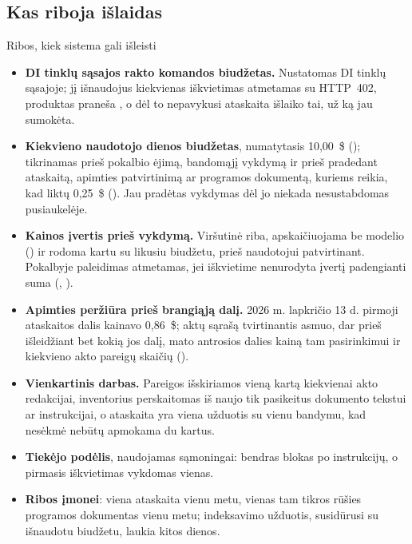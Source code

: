 \subsection{Kas riboja išlaidas}

\begin{codebox}{Ribos, kiek sistema gali išleisti}
\begin{itemize}
  \item \textbf{DI tinklų sąsajos rakto komandos biudžetas.} Nustatomas DI tinklų sąsajoje;
    jį išnaudojus kiekvienas iškvietimas atmetamas su HTTP~402, produktas praneša
    , o dėl to nepavykusi ataskaita išlaiko tai, už ką jau
    sumokėta.
  \item \textbf{Kiekvieno naudotojo dienos biudžetas}, numatytasis 10,00~\$
    (); tikrinamas prieš pokalbio ėjimą, bandomąjį vykdymą ir
    prieš pradedant ataskaitą, apimties patvirtinimą ar programos dokumentą, kuriems reikia,
    kad liktų 0,25~\$ (). Jau pradėtas vykdymas dėl jo
    niekada nesustabdomas pusiaukelėje.
  \item \textbf{Kainos įvertis prieš vykdymą.} Viršutinė riba, apskaičiuojama be modelio
    () ir rodoma kartu su likusiu biudžetu, prieš naudotojui
    patvirtinant. Pokalbyje paleidimas atmetamas, jei iškvietime nenurodyta įvertį
    padengianti suma (, ).
  \item \textbf{Apimties peržiūra prieš brangiąją dalį.} 2026 m. lapkričio 13 d. pirmoji
    ataskaitos dalis kainavo 0,86~\$; aktų sąrašą tvirtinantis asmuo, dar prieš išleidžiant
    bet kokią jos dalį, mato antrosios dalies kainą tam pasirinkimui ir kiekvieno akto
    pareigų skaičių ().
  \item \textbf{Vienkartinis darbas.} Pareigos išskiriamos vieną kartą kiekvienai akto
    redakcijai, inventorius perskaitomas iš naujo tik pasikeitus dokumento tekstui ar
    instrukcijai, o ataskaita yra viena užduotis su vienu bandymu, kad nesėkmė nebūtų
    apmokama du kartus.
  \item \textbf{Tiekėjo podėlis}, naudojamas sąmoningai: bendras blokas po instrukcijų, o
    pirmasis iškvietimas vykdomas vienas.
  \item \textbf{Ribos įmonei}: viena ataskaita vienu metu, vienas tam tikros rūšies programos
    dokumentas vienu metu; indeksavimo užduotis, susidūrusi su išnaudotu biudžetu, laukia
    kitos dienos.
\end{itemize}
\end{codebox}

